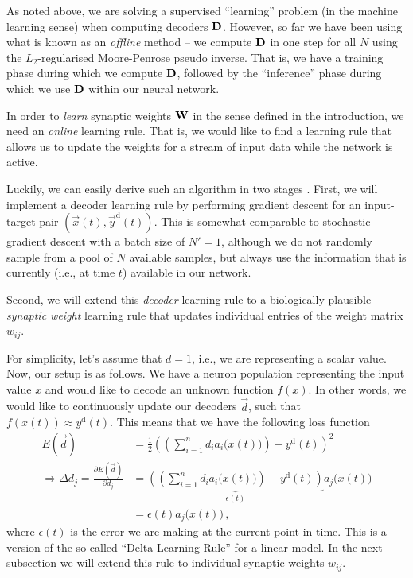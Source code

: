 \documentclass[10pt,letterpaper,oneside]{article}
\begin{document}
As noted above, we are solving a supervised \enquote{learning} problem (in the machine learning sense) when computing decoders ${\mathbf{D}}$. However, so far we have been using what is known as an \emph{offline} method -- we compute ${\mathbf{D}}$ in one step for all $N$ using the $L_2$-regularised Moore-Penrose pseudo inverse. That is, we have a training phase during which we compute ${\mathbf{D}}$, followed by the \enquote{inference} phase during which we use ${\mathbf{D}}$ within our neural network.

In order to \emph{learn} synaptic weights ${\mathbf{W}}$ in the sense defined in the introduction, we need an \emph{online} learning rule. That is, we would like to find a learning rule that allows us to update the weights for a stream of input data while the network is active.

Luckily, we can easily derive such an algorithm in two stages \cite{macneil2011}. First, we will implement a decoder learning rule by performing gradient descent for an input-target pair $(\vec x(t), \vec y^\mathrm{d}(t))$. This is somewhat comparable to stochastic gradient descent with a batch size of $N' = 1$, although we do not randomly sample from a pool of $N$ available samples, but always use the information that is currently (i.e., at time $t$) available in our network.

Second, we will extend this \emph{decoder} learning rule to a biologically plausible \emph{synaptic weight} learning rule that updates individual entries of the weight matrix $w_{ij}$.

For simplicity, let's assume that $d = 1$, i.e., we are representing a scalar value. Now, our setup is as follows. We have a neuron population representing the input value $x$ and would like to decode an unknown function $f(x)$. In other words, we would like to continuously update our decoders $\vec d$, such that $f(x(t)) \approx y^\mathrm{d}(t)$. This means that we have the following loss function
\begin{align*}
	E(\vec d) &= \frac{1}2 \left(\left(\sum_{i = 1}^n d_i a_i\big(x(t)\big) \right) - y^\mathrm{d}(t) \right)^2 \\
	\Rightarrow \Delta d_j = \frac{\partial E(\vec d)}{\partial d_j} &= \underbrace{\left(\left(\sum_{i = 1}^n d_i a_i\big(x(t)\big) \right) - y^\mathrm{d}(t)\right)}_{\epsilon(t)} a_j\big(x(t)\big) \\
		&= \epsilon(t) a_j\big(x(t)\big) \,,
\end{align*}
where $\epsilon(t)$ is the error we are making at the current point in time. This is a version of the so-called \enquote{Delta Learning Rule} for a linear model. In the next subsection we will extend this rule to individual synaptic weights $w_{ij}$.
\end{document}
